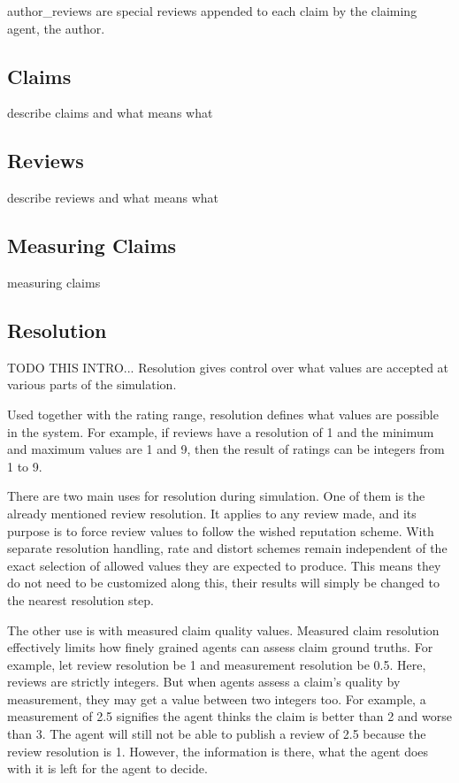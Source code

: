 \documentclass[%
    ]{\PathToTumTemplate/thesis/tum_thesis}
\begin{document}
\Glspl{author_review} are special \glspl{review} appended to each claim by the claiming agent, the author.

\subsection{Claims}
describe claims and what means what

\subsection{Reviews}
describe reviews and what means what

\subsection{Measuring Claims}\label{sec:approach_measure_claim}
measuring claims


\subsection{Resolution}\label{sec:approach_resolution}
TODO THIS INTRO...
Resolution gives control over what values are accepted at various parts of the simulation.

Used together with the rating range, resolution defines what values are possible in the system.
For example, if reviews have a resolution of 1 and the minimum and maximum values are 1 and 9, then the result of ratings can be integers from 1 to 9.

There are two main uses for resolution during simulation.
One of them is the already mentioned review resolution.
It applies to any review made, and its purpose is to force review values to follow the wished reputation scheme.
With separate resolution handling, rate and distort schemes remain independent of the exact selection of allowed values they are expected to produce.
This means they do not need to be customized along this, their results will simply be changed to the nearest resolution step.

The other use is with measured claim quality values.
Measured claim resolution effectively limits how finely grained agents can assess claim ground truths.
For example, let review resolution be 1 and measurement resolution be 0.5.
Here, reviews are strictly integers.
But when agents assess a claim's quality by measurement, they may get a value between two integers too.
For example, a measurement of 2.5 signifies the agent thinks the claim is better than 2 and worse than 3.
The agent will still not be able to publish a review of 2.5 because the review resolution is 1.
However, the information is there, what the agent does with it is left for the agent to decide.
\end{document}
